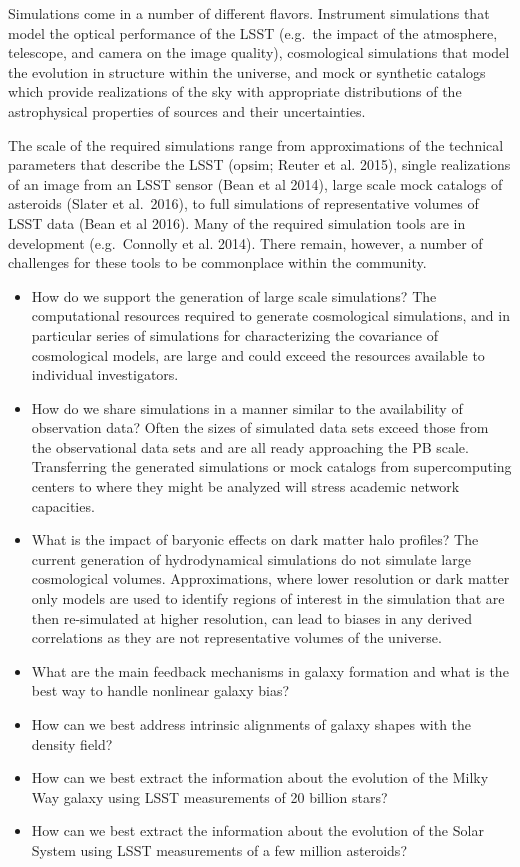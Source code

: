 \documentclass{iau}
\begin{document}
Simulations come in a number of different flavors. Instrument
simulations that model the optical performance of the LSST (e.g.\ the
impact of the atmosphere, telescope, and camera on the image quality),
cosmological simulations that model the evolution in structure within
the universe, and mock or synthetic catalogs which provide
realizations of the sky with appropriate distributions of the
astrophysical properties of sources and their uncertainties.

The scale of the required simulations range from approximations of the
technical parameters that describe the LSST (opsim; Reuter et
al. 2015), single realizations of an image from an LSST sensor (Bean
et al 2014), large scale mock catalogs of asteroids (Slater et al.\
2016), to full simulations of representative volumes of LSST data
(Bean et al 2016). Many of the required simulation tools are in
development (e.g.\ Connolly et al. 2014). There remain, however, a
number of challenges for these tools to be commonplace within the
community.

\begin{itemize}
\item How do we support the generation of large scale simulations? The
  computational resources required to generate cosmological
  simulations, and in particular series of simulations for
  characterizing the covariance of cosmological models, are large and
  could exceed the resources available to individual investigators.
\item How do we share simulations in a manner similar to the
  availability of observation data? Often the sizes of simulated data
  sets exceed those from the observational data sets and are all ready
  approaching the PB scale. Transferring the generated simulations or
  mock catalogs from supercomputing centers to where they might be
  analyzed will stress academic network capacities.
\item What is the impact of baryonic effects on dark matter halo
  profiles? The current generation of hydrodynamical simulations do
  not simulate large cosmological volumes. Approximations, where lower
  resolution or dark matter only models are used to identify regions
  of interest in the simulation that are then re-simulated at higher
  resolution, can lead to biases in any derived correlations as they
  are not representative volumes of the universe.
\item What are the main feedback mechanisms in galaxy formation and
  what is the best way to handle nonlinear galaxy bias?
\item How can we best address intrinsic alignments of galaxy shapes with the density field? 
\item How can we best extract the information about the evolution of the Milky Way galaxy using 
         LSST measurements of 20 billion stars? 
\item How can we best extract the information about the evolution of the Solar System using LSST 
         measurements of a few million asteroids?  
\end{itemize}
\end{document}
